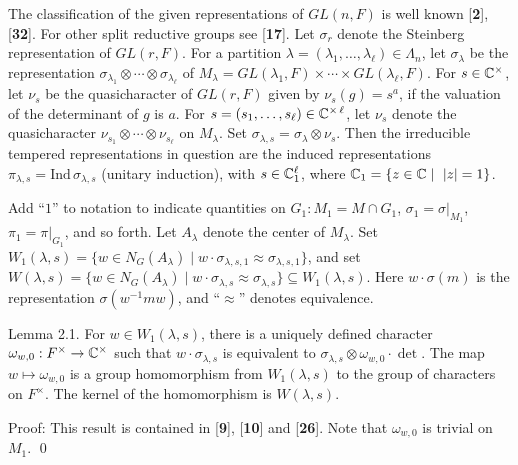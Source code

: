 The classification of the given representations of $ GL (n,F) $
is well known [{\bf 2}], [{\bf 32}].  For other split reductive
groups see [{\bf 17}].  Let $\sigma_r$ denote the Steinberg
representation of $GL(r,F)$.  For a partition 
$\lambda=(\lambda_1,\ldots,\lambda_\ell)\in\Lambda_n$, let
$\sigma_\lambda$ be the representation $\sigma_{\lambda_1}\otimes
\cdots\otimes\sigma_{\lambda_\ell}$ of $M_\lambda  = 
GL(\lambda_1,F)\times \cdots\times GL(\lambda_\ell,F)$.  For
$s\in {\Bbb C}^\times$, let $\nu_s$ be the quasicharacter of
$GL(r,F)$ given by $\nu_s(g) = s^a$, if the valuation of the determinant
of $g$ is $a$.  For $s=(s_1,\ldots,s_\ell)\in {\Bbb C}^{\times\,\ell}$, let
$\nu_s$ denote the quasicharacter $\nu_{s_1}\otimes\cdots\otimes
\nu_{s_\ell}$ on $M_\lambda$.  Set $\sigma_{\lambda,s}=\sigma_\lambda
\otimes \nu_s$.  Then the irreducible tempered representations 
in question are the induced representations 
$\pi_{\lambda,s} = \text{Ind}\,\sigma_{\lambda,s}$ (unitary
induction), with $s\in {\Bbb C}_1^\ell$, where ${\Bbb C_1}= \{z\in {\Bbb C}\mid
\ |z|=1\}$.

Add ``$1$'' to notation to indicate quantities on 
  $ G_1 : M_1 = M \cap G_1$,
  $ \sigma_1 = \sigma \big|_{M_1} $,
  $ \pi_1 = \pi \big|_{G_1} $, and so forth.
Let $A_\lambda$ denote the center of $M_\lambda$.
Set
  $ W_1 (\lambda,s) =
    \{ w \in N_G(A_{\lambda}) \mid
       w \cdot \sigma_{\lambda,s,1} \approx
       \sigma_{\lambda,s,1} 
    \} $,
and set
  $ W(\lambda,s) =
   \{ w \in N_G(A_{\lambda}) \mid
       w \cdot \sigma_{\lambda,s} \approx
       \sigma_{\lambda,s} 
    \} \subseteq W_1(\lambda,s) $.
Here
  $ w \cdot \sigma (m)$ is the representation  $ \sigma(w^{-1} mw) $,
  and ``$\approx$'' denotes equivalence.

\proclaim Lemma {2.1}.
For
  $ w \in W_1(\lambda,s) $,
there is a uniquely defined character
  $ \omega_{w,0}: F^{\times} \to {\Bbb C}^{\times} $
such that
  $ w \cdot \sigma_{\lambda,s} $ is equivalent to
   $\sigma_{\lambda,s} \otimes
   \omega_{w,0} \cdot \det $.
The map
  $ w \mapsto \omega_{w,0} $
is a group homomorphism from 
  $ W_1(\lambda,s) $
to the group of characters on 
  $ F^{\times} $.
The kernel of the homomorphism is
  $ W(\lambda,s) $.
\finishproclaim

\pproclaim Proof: This result is contained in {\rm [{\bf 9}], [{\bf 10}] and [{\bf 26}]}.
Note that
  $ \omega_{w,0} $
is trivial on
  $ M_1 $.
%
\qed
\finishpproclaim

